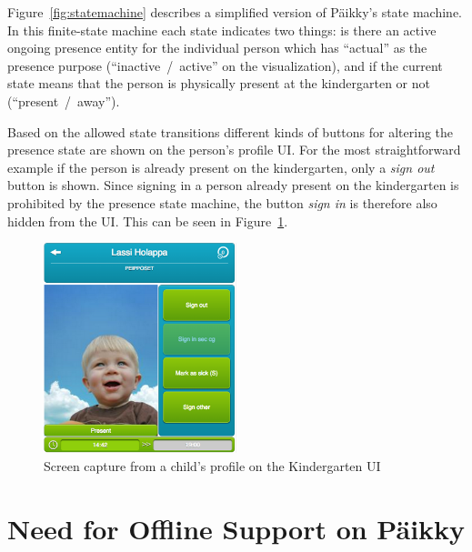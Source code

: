 Figure~\ref{fig:statemachine} describes a simplified version of Päikky's state machine. In this finite-state machine each state indicates two things: is there an active ongoing presence entity for the individual person which has ``actual'' as the presence purpose (``inactive~/~active'' on the visualization), and if the current state means that the person is physically present at the kindergarten or not (``present~/~away'').

Based on the allowed state transitions different kinds of buttons for altering the presence state are shown on the person's profile UI. For the most straightforward example if the person is already present on the kindergarten, only a \textit{sign out} button is shown. Since signing in a person already present on the kindergarten is prohibited by the presence state machine, the button \textit{sign in} is therefore also hidden from the UI. This can be seen in Figure~\ref{fig:child-profile}. 


\begin{figure}[t]
\begin{center}
\includegraphics[width=0.5\textwidth]{assets/child-profile.png}
\end{center}
\caption{Screen capture from a child's profile on the Kindergarten UI}
\label{fig:child-profile}
\end{figure}







\section{Need for Offline Support on Päikky}
\label{sec:need-for-offline-support}

